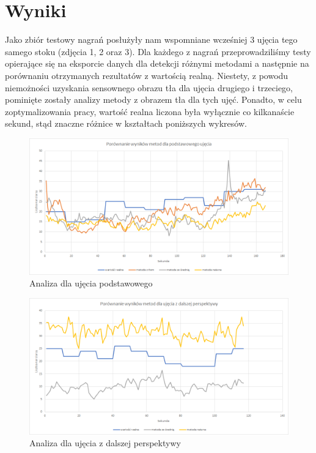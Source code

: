 \documentclass[a4paper]{article}
\begin{document}
\section{Wyniki}
Jako zbiór testowy nagrań posłużyły nam wspomniane wcześniej 3 ujęcia tego samego stoku (zdjęcia 1, 2 oraz 3). Dla każdego z nagrań przeprowadziliśmy testy opierające się na eksporcie danych dla detekcji różnymi metodami a następnie na porównaniu otrzymanych rezultatów z wartością realną. Niestety, z powodu niemożności uzyskania sensownego obrazu tła dla ujęcia drugiego i trzeciego, pominięte zostały analizy metody z obrazem tła dla tych ujęć. Ponadto, w celu zoptymalizowania pracy, wartość realna liczona była wyłącznie co kilkanaście sekund, stąd znaczne różnice w kształtach poniższych wykresów.\\
\begin{figure}[H]
  \includegraphics[width=\linewidth]{resources/img8.png}
  \caption{Analiza dla ujęcia podstawowego}
\end{figure}
\begin{figure}[H]
  \includegraphics[width=\linewidth]{resources/img9.png}
  \caption{Analiza dla ujęcia z dalszej perspektywy}
\end{figure}
\end{document}
